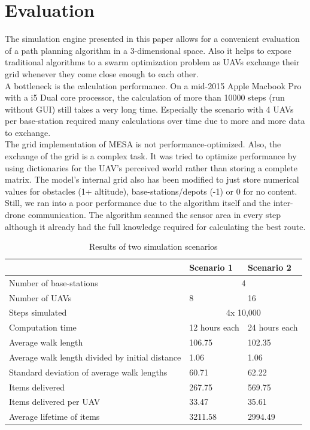 \section{Evaluation}\label{sec:evaluation}
The simulation engine presented in this paper allows for a convenient evaluation of a path planning algorithm in a 3-dimensional space. Also it helps to expose traditional algorithms to a swarm optimization problem as UAVs exchange their grid whenever they come close enough to each other.\\
A bottleneck is the calculation performance. On a mid-2015 Apple Macbook Pro with a i5 Dual core processor, the calculation of more than 10000 steps (run without GUI) still takes a very long time. Especially the scenario with 4 UAVs per base-station required many calculations over time due to more and more data to exchange. \\
The grid implementation of MESA is not performance-optimized. Also, the exchange of the grid is a complex task. It was tried to optimize performance by using dictionaries for the UAV's perceived world rather than storing a complete matrix. The model's internal grid also has been modified to just store numerical values for obstacles (1+ altitude), base-stations/depots (-1) or 0 for no content.\\
Still, we ran into a poor performance due to the algorithm itself and the inter-drone communication. The algorithm scanned the sensor area in every step although it already had the full knowledge required for calculating the best route.  \\
 \begin{table}[tbhp]\label{tab:results}
 	\centering

  \begin{tabular}{ | l | l | l |}
    \hline
     & \textbf{Scenario 1} 					& \textbf{Scenario 2}				\\ \hline
    Number of base-stations 	& \multicolumn{2}{|c|}{4}\\ \hline
    Number of UAVs 				& 8								& 16\\ \hline
    Steps simulated 				& \multicolumn{2}{|c|}{4x 10,000}\\ \hline
    Computation time 			& 12 hours 	each				& 24 hours each \\ \hline
    Average walk length 		& 106.75							& 102.35\\ \hline
    Average walk length divided by initial distance & 1.06 & 1.06 \\ \hline
    Standard deviation of average walk lengths & 60.71 & 62.22 \\ \hline 
    Items delivered 				& 267.75					&  569.75\\ \hline
    Items delivered per UAV & 33.47 & 35.61\\ \hline
    Average lifetime of items &3211.58 & 2994.49 \\ \hline
    \hline
  \end{tabular}
	 	
  \caption{Results of two simulation scenarios}
 \end{table}
